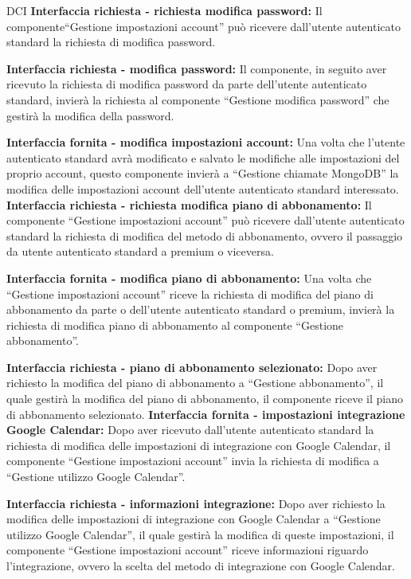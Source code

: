 \begin{listaPersonale}{DCI}
    \textbf{Interfaccia richiesta - richiesta modifica password:} Il componente“Gestione impostazioni account” può ricevere dall'utente autenticato standard la richiesta di modifica password.

    \textbf{Interfaccia richiesta - modifica password:} Il componente, in seguito aver ricevuto la richiesta di modifica password da parte dell'utente autenticato standard, invierà la richiesta al componente “Gestione modifica password” che gestirà la modifica della password.

    \textbf{Interfaccia fornita - modifica impostazioni account:} Una volta che l'utente autenticato standard avrà modificato e salvato le modifiche alle impostazioni del proprio account, questo componente invierà a “Gestione chiamate MongoDB” la modifica delle impostazioni account dell'utente autenticato standard interessato. \\
    \textbf{Interfaccia richiesta - richiesta modifica piano di
        abbonamento:} Il componente “Gestione impostazioni account” può ricevere dall'utente autenticato standard la richiesta di modifica del metodo di abbonamento, ovvero il passaggio da utente autenticato standard a premium o viceversa.

    \textbf{Interfaccia fornita - modifica piano di abbonamento:} Una volta che “Gestione impostazioni account” riceve la richiesta di modifica del piano di abbonamento da parte o dell'utente autenticato standard o premium, invierà la richiesta di modifica piano di abbonamento al componente “Gestione abbonamento”.

    \textbf{Interfaccia richiesta - piano di abbonamento selezionato:} Dopo aver richiesto la modifica del piano di abbonamento a “Gestione abbonamento”, il quale gestirà la modifica del piano di abbonamento, il componente riceve il piano di abbonamento selezionato.
    \textbf{Interfaccia fornita - impostazioni integrazione Google
        Calendar:} Dopo aver ricevuto dall'utente autenticato standard la richiesta di modifica delle impostazioni di integrazione con Google Calendar, il componente “Gestione impostazioni account” invia la richiesta di modifica a “Gestione utilizzo Google Calendar”.

    \textbf{Interfaccia richiesta - informazioni integrazione:} Dopo aver richiesto la modifica delle impostazioni di integrazione con Google Calendar a “Gestione utilizzo Google Calendar”, il quale gestirà la modifica di queste impostazioni, il componente “Gestione impostazioni account” riceve informazioni riguardo l'integrazione, ovvero la scelta del metodo di integrazione con Google Calendar.


\end{listaPersonale}
